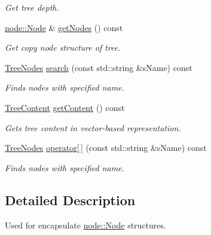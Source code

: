 \begin{DoxyCompactItemize}
\begin{DoxyCompactList}\small\item\em Get tree depth. \end{DoxyCompactList}\item 
\hypertarget{classtree_1_1Tree_a8510242d20d1a62e694bdda7d6f08355}{\hyperlink{classnode_1_1Node}{node\-::\-Node} \& \hyperlink{classtree_1_1Tree_a8510242d20d1a62e694bdda7d6f08355}{get\-Nodes} () const }\label{classtree_1_1Tree_a8510242d20d1a62e694bdda7d6f08355}

\begin{DoxyCompactList}\small\item\em Get {\itshape copy} node structure of tree. \end{DoxyCompactList}\item 
\hyperlink{namespacetree_a36da3b38ad98fe87c16c4336cd5b8a44}{Tree\-Nodes} \hyperlink{classtree_1_1Tree_a4dce9d5202dc7412ec8f1432040d5deb}{search} (const std\-::string \&s\-Name) const 
\begin{DoxyCompactList}\small\item\em Finds nodes with specified name. \end{DoxyCompactList}\item 
\hypertarget{classtree_1_1Tree_ae84318b936a74cfd6f8ba2705b1bd6ac}{\hyperlink{namespacetree_a1906ab31086935949f162ea3e2c41200}{Tree\-Content} \hyperlink{classtree_1_1Tree_ae84318b936a74cfd6f8ba2705b1bd6ac}{get\-Content} () const }\label{classtree_1_1Tree_ae84318b936a74cfd6f8ba2705b1bd6ac}

\begin{DoxyCompactList}\small\item\em Gets tree content in vector-\/based representation. \end{DoxyCompactList}\item 
\hyperlink{namespacetree_a36da3b38ad98fe87c16c4336cd5b8a44}{Tree\-Nodes} \hyperlink{classtree_1_1Tree_a5ae3316bf8d3905413cc5454e5079b3f}{operator\mbox{[}$\,$\mbox{]}} (const std\-::string \&s\-Name) const 
\begin{DoxyCompactList}\small\item\em Finds nodes with specified name. \end{DoxyCompactList}\end{DoxyCompactItemize}


\subsection{Detailed Description}
Used for encapsulate \hyperlink{classnode_1_1Node}{node\-::\-Node} structures. 

